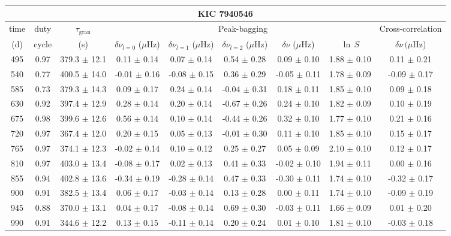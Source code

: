 \documentclass[twocolumn]{aastex61}%
\begin{document}
\begin{table*}[ht]\centering\fontsize{9.}{7.}\selectfont
\begin{tabular}{ccc|ccccc|c}
\multicolumn{9}{c}{KIC 7940546}\\ \hline\hline
time & duty & $\tau_\text{gran}$ &\multicolumn{5}{c|}{Peak-bagging}&Cross-correlation\\
(d)& cycle & (s)&$\delta\nu_{l=0}$ ($\mu$Hz) & $\delta\nu_{l=1}$ ($\mu$Hz) & $\delta\nu_{l=2}$ ($\mu$Hz) & $\delta\nu$ ($\mu$Hz)& $\ln\,S$ & $\delta\nu\,(\mu$Hz)\\\hline
495 & 0.97 & 379.3 $\pm$ 12.1 & 0.11 $\pm$ 0.14 & 0.07 $\pm$ 0.14 & 0.54 $\pm$ 0.28 & 0.09 $\pm$ 0.10 & 1.88 $\pm$ 0.10 & 0.11 $\pm$ 0.21\\
540 & 0.77 & 400.5 $\pm$ 14.0 & -0.01 $\pm$ 0.16 & -0.08 $\pm$ 0.15 & 0.36 $\pm$ 0.29 & -0.05 $\pm$ 0.11 & 1.78 $\pm$ 0.09 & -0.09 $\pm$ 0.17\\
585 & 0.73 & 379.3 $\pm$ 14.3 & 0.09 $\pm$ 0.17 & 0.24 $\pm$ 0.14 & -0.04 $\pm$ 0.31 & 0.18 $\pm$ 0.11 & 1.85 $\pm$ 0.10 & 0.09 $\pm$ 0.18\\
630 & 0.92 & 397.4 $\pm$ 12.9 & 0.28 $\pm$ 0.14 & 0.20 $\pm$ 0.14 & -0.67 $\pm$ 0.26 & 0.24 $\pm$ 0.10 & 1.82 $\pm$ 0.09 & 0.10 $\pm$ 0.19\\
675 & 0.98 & 399.6 $\pm$ 12.6 & 0.56 $\pm$ 0.14 & 0.10 $\pm$ 0.14 & -0.44 $\pm$ 0.26 & 0.32 $\pm$ 0.10 & 1.77 $\pm$ 0.10 & 0.21 $\pm$ 0.16\\
720 & 0.97 & 367.4 $\pm$ 12.0 & 0.20 $\pm$ 0.15 & 0.05 $\pm$ 0.13 & -0.01 $\pm$ 0.30 & 0.11 $\pm$ 0.10 & 1.85 $\pm$ 0.10 & 0.15 $\pm$ 0.17\\
765 & 0.97 & 374.1 $\pm$ 12.3 & -0.02 $\pm$ 0.14 & 0.10 $\pm$ 0.12 & 0.25 $\pm$ 0.27 & 0.05 $\pm$ 0.09 & 2.10 $\pm$ 0.10 & 0.12 $\pm$ 0.17\\
810 & 0.97 & 403.0 $\pm$ 13.4 & -0.08 $\pm$ 0.17 & 0.02 $\pm$ 0.13 & 0.41 $\pm$ 0.33 & -0.02 $\pm$ 0.10 & 1.94 $\pm$ 0.11 & 0.00 $\pm$ 0.16\\
855 & 0.94 & 402.8 $\pm$ 13.6 & -0.34 $\pm$ 0.19 & -0.28 $\pm$ 0.14 & 0.47 $\pm$ 0.33 & -0.30 $\pm$ 0.11 & 1.74 $\pm$ 0.10 & -0.32 $\pm$ 0.17\\
900 & 0.91 & 382.5 $\pm$ 13.4 & 0.06 $\pm$ 0.17 & -0.03 $\pm$ 0.14 & 0.13 $\pm$ 0.28 & 0.00 $\pm$ 0.11 & 1.74 $\pm$ 0.10 & -0.09 $\pm$ 0.19\\
945 & 0.88 & 370.0 $\pm$ 13.1 & 0.04 $\pm$ 0.17 & -0.08 $\pm$ 0.14 & 0.69 $\pm$ 0.30 & -0.03 $\pm$ 0.11 & 1.66 $\pm$ 0.09 & 0.01 $\pm$ 0.20\\
990 & 0.91 & 344.6 $\pm$ 12.2 & 0.13 $\pm$ 0.15 & -0.11 $\pm$ 0.14 & 0.20 $\pm$ 0.24 & 0.01 $\pm$ 0.10 & 1.81 $\pm$ 0.10 & -0.03 $\pm$ 0.18\\

\end{tabular}
\end{table*}
\end{document}
